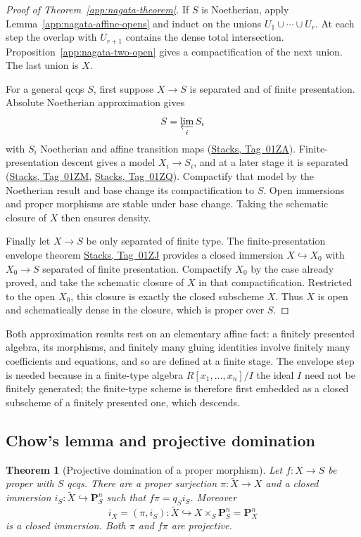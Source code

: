 \documentclass[11pt,a4paper]{article}
\numberwithin{equation}{section}
\newtheorem{theorem}{Theorem}[section]
\theoremstyle{definition}
\theoremstyle{remark}
\newcommand{\stacks}[1]{\href{https://stacks.math.columbia.edu/tag/#1}{\textnormal{Stacks, Tag~#1}}}
\begin{document}
\begin{proof}[Proof of Theorem~\ref{app:nagata-theorem}]
If $S$ is Noetherian, apply Lemma~\ref{app:nagata-affine-opens} and
induct on the unions $U_1\cup\cdots\cup U_r$.
At each step the overlap with $U_{r+1}$ contains the dense total
intersection. Proposition~\ref{app:nagata-two-open} gives a
compactification of the next union. The last union is $X$.

For a general qcqs $S$, first suppose $X\to S$ is separated and
of finite presentation. Absolute Noetherian approximation gives
\[
 S=\varprojlim_i S_i
\]
with $S_i$ Noetherian and affine transition maps (\stacks{01ZA}).
Finite-presentation descent gives a model $X_i\to S_i$, and at a
later stage it is separated (\stacks{01ZM}, \stacks{01ZQ}).
Compactify that model by the Noetherian result and base change
its compactification to $S$. Open immersions and proper morphisms
are stable under base change. Taking the schematic closure of $X$
then ensures density.

Finally let $X\to S$ be only separated of finite type.
The finite-presentation envelope theorem \stacks{01ZJ} provides a
closed immersion $X\hookrightarrow X_0$ with $X_0\to S$
separated of finite presentation. Compactify $X_0$ by the case
already proved, and take the schematic closure of $X$ in that
compactification. Restricted to the open $X_0$, this closure is
exactly the closed subscheme $X$. Thus $X$ is open and schematically
dense in the closure, which is proper over $S$.
\end{proof}

Both approximation results rest on an elementary affine fact: a
finitely presented algebra, its morphisms, and finitely many gluing
identities involve finitely many coefficients and equations, and so
are defined at a finite stage. The envelope step is needed because in
a finite-type algebra $R[x_1,\ldots,x_n]/I$ the ideal $I$ need not be
finitely generated; the finite-type scheme is therefore first embedded
as a closed subscheme of a finitely presented one, which descends.

\subsection{Chow's lemma and projective domination}

\begin{theorem}[Projective domination of a proper morphism]
\label{app:chow-projective}
Let $f:X\to S$ be proper with $S$ qcqs. There are a proper
surjection $\pi:\widetilde X\to X$ and a closed immersion
$i_S:\widetilde X\hookrightarrow\mathbf P^n_S$ such that
$f\pi=q_Si_S$. Moreover
\[
 i_X=(\pi,i_S):\widetilde X\hookrightarrow
 X\times_S\mathbf P^n_S=\mathbf P^n_X
\]
is a closed immersion. Both $\pi$ and $f\pi$ are projective.
\end{theorem}
\end{document}
